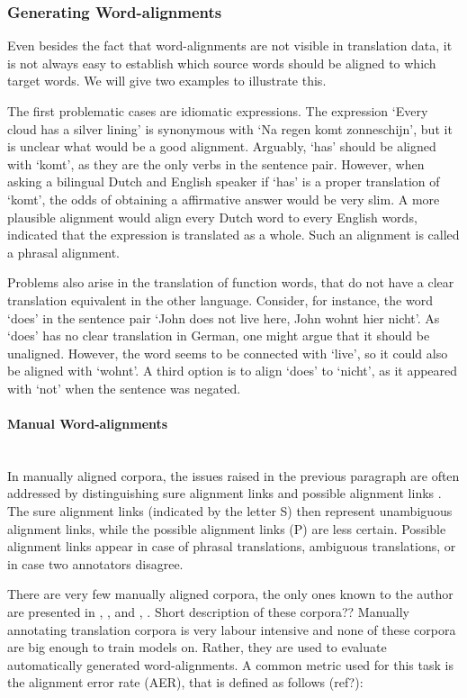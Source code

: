 \documentclass{report}
\newcommand{\myparagraph}[1]{\paragraph{#1}\mbox{}\\}
\theoremstyle{break}
\begin{document}
\subsubsection{Generating Word-alignments}

Even besides the fact that word-alignments are not visible in translation data, it is not always easy to establish which source words should be aligned to which target words. We will give two examples to illustrate this.

The first problematic cases are idiomatic expressions. The expression `Every cloud has a silver lining'  is synonymous with `Na regen komt zonneschijn', but it is unclear what would be a good alignment. Arguably, `has' should be aligned with `komt', as they are the only verbs in the sentence pair. However, when asking a bilingual Dutch and English speaker if `has' is a proper translation of `komt', the odds of obtaining a affirmative answer would be very slim. A more plausible alignment would align every Dutch word to every English words, indicated that the expression is translated as a whole. Such an alignment is called a phrasal alignment.

Problems also arise in the translation of function words, that do not have a clear translation equivalent in the other language. Consider, for instance, the word `does' in the sentence pair `John does not live here, John wohnt hier nicht'. As `does' has no clear translation in German, one might argue that it should be unaligned. However, the word seems to be connected with `live', so it could also be aligned with `wohnt'. A third option is to align `does' to `nicht', as it appeared with `not' when the sentence was negated.\citep[Example from][p.114]{koehn2008statistical}

\myparagraph{Manual Word-alignments}
In manually aligned corpora, the issues raised in the previous paragraph are often addressed by distinguishing sure alignment links and possible alignment links \citep{lambert2005guidelines}. The sure alignment links (indicated by the letter S) then represent unambiguous alignment links, while the possible alignment links (P) are less certain. Possible alignment links appear in case of phrasal translations, ambiguous translations, or in case two annotators disagree. 

There are very few manually aligned corpora, the only ones known to the author are presented in \cite{och2000improved}, \cite{graca2008building}, \cite{mihalcea2003evaluation} and \cite{pado2006optimal}, \cite{ahrenberg2000evaluation}. Short description of these corpora??
Manually annotating translation corpora is very labour intensive and none of these corpora are big enough to train models on. Rather, they are used to evaluate automatically generated word-alignments. A common metric used for this task is the alignment error rate (AER), that is defined as follows (ref?):
\end{document}
